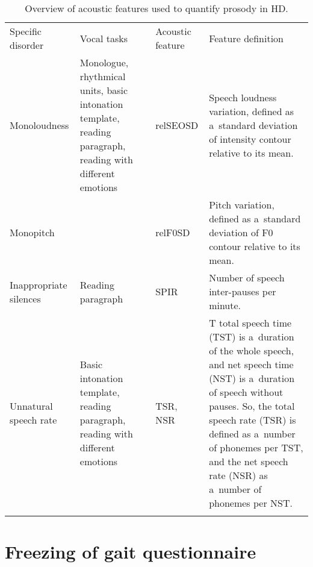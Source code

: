 \begin{table*}[htb!]
	\caption{Overview of acoustic features used to quantify prosody in HD.}
	\footnotesize
    \centering
	\label{tab:prosodic_features}
	
	
	\begin{tabularx}{1.00\textwidth}{mmsX}
		\hline\hline\noalign{\smallskip}
		Specific disorder & Vocal tasks & Acoustic feature & Feature definition \\
		\noalign{\smallskip}\hline\noalign{\smallskip}
		Monoloudness & Monologue, rhythmical units, basic intonation template, reading paragraph, reading with different emotions & relSEOSD & Speech loudness variation, defined as a~standard deviation of intensity contour relative to its mean. \\
		Monopitch &  & relF0SD & Pitch variation, defined as a~standard deviation of F0 contour relative to its mean. \\
		Inappropriate silences & Reading paragraph & SPIR & Number of speech inter-pauses per minute. \\
		Unnatural speech rate & Basic intonation template, reading paragraph, reading with different emotions & TSR, NSR & T total speech time (TST) is a~duration of the whole speech, and net speech time (NST) is a~duration of speech without pauses. So, the total speech rate (TSR) is defined as a~number of phonemes per TST, and the net speech rate (NSR) as a~number of phonemes per NST. \\
		\noalign{\smallskip}\hline\hline
	\end{tabularx}
\end{table*}

\newpage

\section{Freezing of gait questionnaire}

